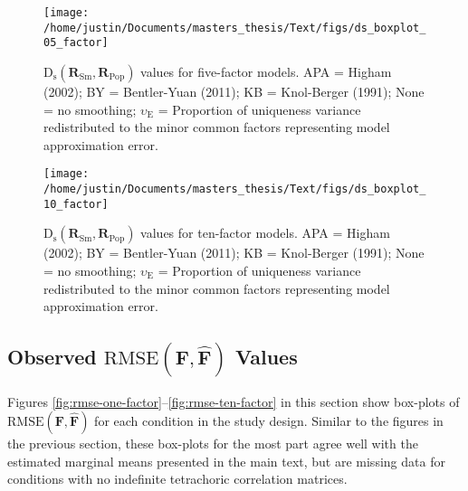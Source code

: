 \documentclass[
  english,
  man]{apa6}
\begin{document}
\begin{appendix}
\begin{figure}

{\centering \texttt{[image: /home/justin/Documents/masters\_thesis/Text/figs/ds\_boxplot\_05\_factor]} 

}

\caption{$\textrm{D}_{\textrm{s}}(\mathbf{R}_{\textrm{Sm}}, \mathbf{R}_{\textrm{Pop}})$ values for five-factor models. APA = Higham (2002); BY = Bentler-Yuan (2011); KB = Knol-Berger (1991); None = no smoothing; $\upsilon_{\textrm{E}}$ = Proportion of uniqueness variance redistributed to the minor common factors representing model approximation error.}\label{fig:ds-five-factor}
\end{figure}

\begin{figure}

{\centering \texttt{[image: /home/justin/Documents/masters\_thesis/Text/figs/ds\_boxplot\_10\_factor]} 

}

\caption{$\textrm{D}_{\textrm{s}}(\mathbf{R}_{\textrm{Sm}}, \mathbf{R}_{\textrm{Pop}})$ values for ten-factor models. APA = Higham (2002); BY = Bentler-Yuan (2011); KB = Knol-Berger (1991); None = no smoothing; $\upsilon_{\textrm{E}}$ = Proportion of uniqueness variance redistributed to the minor common factors representing model approximation error.}\label{fig:ds-ten-factor}
\end{figure}

\pagebreak

\hypertarget{observed-textrmrmsemathbff-hatmathbff-values}{%
\subsection{\texorpdfstring{Observed
\(\textrm{RMSE}(\mathbf{F}, \hat{\mathbf{F}})\)
Values}{Observed \textbackslash textrm\{RMSE\}(\textbackslash mathbf\{F\}, \textbackslash hat\{\textbackslash mathbf\{F\}\}) Values}}\label{observed-textrmrmsemathbff-hatmathbff-values}}

Figures \ref{fig:rmse-one-factor}--\ref{fig:rmse-ten-factor} in this
section show box-plots of
\(\textrm{RMSE}(\mathbf{F}, \hat{\mathbf{F}})\) for each condition in
the study design. Similar to the figures in the previous section, these
box-plots for the most part agree well with the estimated marginal means
presented in the main text, but are missing data for conditions with no
indefinite tetrachoric correlation matrices.

\begin{figure}


\end{figure}
\end{appendix}
\end{document}
